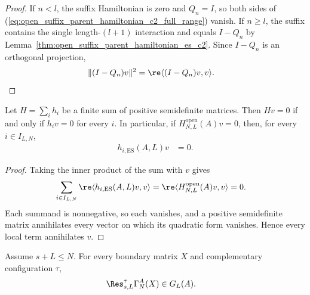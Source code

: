 \begin{proof}
    \leanok
    If $n<l$, the suffix Hamiltonian is zero and $Q_n=I$, so both sides of
    (\ref{eq:open_suffix_parent_hamiltonian_c2_full_range}) vanish.  If
    $n\geq l$, the suffix contains the single length-$(l+1)$ interaction and
    equals $I-Q_n$ by Lemma~\ref{thm:open_suffix_parent_hamiltonian_es_c2}.
    Since $I-Q_n$ is an orthogonal projection,
    \begin{align}
        \lVert(I-Q_n)v\rVert^2
         & =\re\langle (I-Q_n)v,v\rangle.
    \end{align}
\end{proof}

\begin{lemma}
    \label{thm:open_parent_hamiltonian_zero_local_terms}
    \leanok
    Let $H=\sum_i h_i$ be a finite sum of positive semidefinite matrices.
    Then $Hv=0$ if and only if $h_iv=0$ for every $i$. In particular, if
    $H^{\mathrm{open}}_{N,L}(A)v=0$, then, for every $i\in I_{L,N}$,
    \begin{align}
        h_{i,\mathrm{ES}}(A,L)v & =0.
    \end{align}
\end{lemma}

\begin{proof}
    \leanok
    Taking the inner product of the sum with $v$ gives
    \begin{align}
        \sum_{i\in I_{L,N}}\re
        \langle h_{i,\mathrm{ES}}(A,L)v,v\rangle
         & =\re\langle H^{\mathrm{open}}_{N,L}(A)v,v\rangle=0.
    \end{align}
    Each summand is nonnegative, so each vanishes, and a positive
    semidefinite matrix annihilates every vector on which its quadratic form
    vanishes. Hence every local term annihilates $v$.
\end{proof}

\begin{lemma}
    \label{thm:contiguous_restriction_ground_space_map}
    \leanok
    Assume $s+L\leq N$. For every boundary matrix $X$ and complementary
    configuration $\tau$,
    \begin{align}
        \Res^\tau_{s,L}\Gamma_N^A(X) & \in G_L(A).
    \end{align}
\end{lemma}


